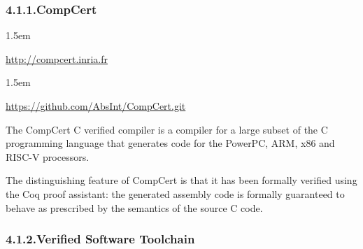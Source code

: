 \documentclass[12pt,twoside]{article}
\begin{document}
\subsubsection{4.1.1.\hspace*{0.5em}CompCert}%

\begin{mddefinitions}%


\begin{mdbmarginx}{}{}{}{1.5em}%
\begin{mddefdata}%
\href{http://compcert.inria.fr}{{\ttfamily http://\hspace{0pt}compcert.\hspace{0pt}inria.\hspace{0pt}fr}}
\end{mddefdata}%
\end{mdbmarginx}%


\begin{mdbmarginx}{}{}{}{1.5em}%
\begin{mddefdata}%
\href{https://github.com/AbsInt/CompCert.git}{{\ttfamily https://\hspace{0pt}github.\hspace{0pt}com/\hspace{0pt}AbsInt/\hspace{0pt}CompCert.\hspace{0pt}git}}%
\end{mddefdata}%
\end{mdbmarginx}%
\end{mddefinitions}%

\noindent{}The CompCert C verified compiler is a compiler for a large subset of
the C programming language that generates code for the PowerPC, ARM,
x86 and RISC-V processors.%

The distinguishing feature of CompCert is that it has been formally
verified using the Coq proof assistant: the generated assembly code is
formally guaranteed to behave as prescribed by the semantics of the
source C code.%

\subsubsection{4.1.2.\hspace*{0.5em}Verified Software Toolchain}%
\end{document}
